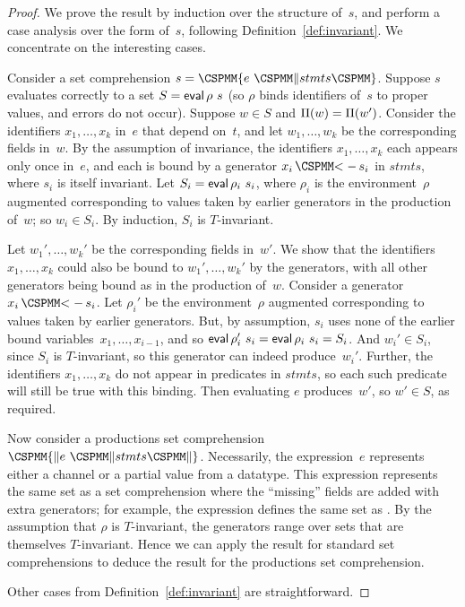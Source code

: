 \begin{proof}
We prove the result by induction over the structure of~$s$, and perform a case
analysis over the form of~$s$, following Definition~\ref{def:invariant}.  We
concentrate on the interesting cases.

Consider a set comprehension $s = \M\{ e ~ \M\| stmts \M\}$.  Suppose $s$
evaluates correctly to a set $S = \mathop{\sf eval} \rho~s$ (so $\rho$ binds identifiers
of~$s$ to proper values, and errors do not occur).  Suppose $w \in S$ and
$\Pi(w) = \Pi(w')$.  Consider the identifiers $x_1,\ldots,x_k$ in~$e$
that depend on~$t$, and let $w_1,\ldots,w_k$ be the corresponding fields
in~$w$.  By the assumption of invariance, the identifiers $x_1,\ldots,x_k$
each appears only once in~$e$, and each is bound by a generator $x_i
\,\M{<-}\, s_i$ in $stmts$, where $s_i$ is itself invariant.  Let $S_i = \mathop{\sf eval}
\rho_i~s_i$, where $\rho_i$ is the environment~$\rho$ augmented corresponding
to values taken by earlier generators in the production of~$w$; so $w_i \in
S_i$.  By induction, $S_i$ is $T$-invariant.

Let $w_1',\ldots,w_k'$ be the corresponding fields in~$w'$.  We show that the
identifiers $x_1,\ldots,x_k$ could also be bound to $w_1',\ldots,w_k'$ by the
generators, with all other generators being bound as in the production of~$w$.
Consider a generator $x_i \,\M{<-}\, s_i$.  Let $\rho_i'$ be the
environment~$\rho$ augmented corresponding to values taken by earlier
generators.  But, by assumption, $s_i$ uses none of the earlier bound
variables~$x_1,\ldots,x_{i-1}$, and so $\mathop{\sf eval} \rho_i'~s_i = \mathop{\sf eval} \rho_i~s_i =
S_i$.  And $w_i' \in S_i$, since $S_i$ is $T$-invariant, so this generator can
indeed produce~$w_i'$.  Further, the identifiers $x_1,\ldots,x_k$ do not
appear in predicates in $stmts$, so each such predicate will still be true
with this binding.  Then evaluating $e$ produces~$w'$, so $w' \in S$, as
required.

Now consider a productions set comprehension $\M{\{\|} e ~ \M\| stmts \M{\|\}}$.
Necessarily, the expression~$e$ represents either a channel or a partial value
from a datatype.  This expression represents the same set as a set
comprehension where the ``missing'' fields are added with extra generators;
for example, the expression   defines the same set as
.  By the assumption that $\rho$ is
$T$-invariant, the generators range over sets that are themselves
$T$-invariant.  Hence we can apply the result for standard set comprehensions
to deduce the result for the productions set comprehension. 

Other cases from Definition~\ref{def:invariant} are straightforward.
\end{proof}




